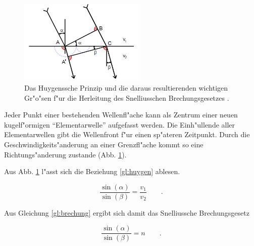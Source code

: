 	\begin{figure}[!h]
		\centering
		\includegraphics[width = 6cm]{img/huygen.jpg}
		\caption{Das Huygenssche Prinzip und die daraus resultierenden wichtigen Gr"o"sen f"ur die Herleitung des Snelliusschen Brechungsgesetzes \cite{anleitung}.}
		\label{huygen}
	\end{figure}

	Jeder Punkt einer bestehenden Wellenfl"ache kann als Zentrum einer neuen kugelf"ormigen "`Elementarwelle"' aufgefasst werden. Die Einh"ullende aller Elementarwellen gibt die Wellenfront f"ur einen sp"ateren Zeitpunkt. Durch die Geschwindigkeits"anderung an einer Grenzfl"ache kommt so eine Richtungs"anderung zustande (Abb. \ref{huygen}).

	Aus Abb. \ref{huygen} l"asst sich die Beziehung \eqref{gl:huygen} ablesen.

	\begin{equation}
		\frac{\sin(\alpha)}{\sin(\beta)} = \frac{v_\mathrm{1}}{v_\mathrm{2}} \qquad . \label{gl:huygen}
	\end{equation}

	Aus Gleichung \eqref{gl:brechung} ergibt sich damit das Snelliussche Brechungsgesetz

	\begin{equation}
		\frac{\sin(\alpha)}{\sin(\beta)} = n \qquad .
	\end{equation}